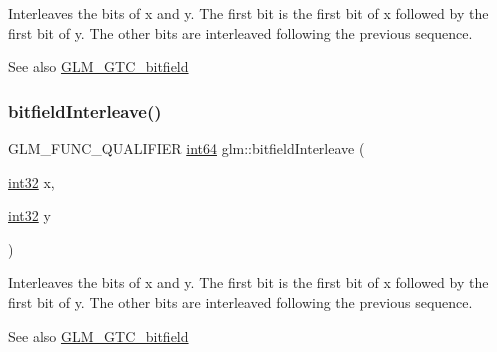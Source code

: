 Interleaves the bits of x and y. The first bit is the first bit of x followed by the first bit of y. The other bits are interleaved following the previous sequence.

\begin{DoxySeeAlso}{See also}
\hyperlink{group__gtc__bitfield}{G\+L\+M\+\_\+\+G\+T\+C\+\_\+bitfield} 
\end{DoxySeeAlso}
\mbox{\label{group__gtc__bitfield_ga0de51d5985e6a703f305a5a61479babd}} 
\subsubsection{\texorpdfstring{bitfield\+Interleave()}{bitfieldInterleave()}\hspace{0.1cm}{\footnotesize\ttfamily [5/16]}}
{\footnotesize\ttfamily G\+L\+M\+\_\+\+F\+U\+N\+C\+\_\+\+Q\+U\+A\+L\+I\+F\+I\+ER \hyperlink{group__gtc__type__precision_ga435d75819cce297cc5fa21bd84ef89a5}{int64} glm\+::bitfield\+Interleave (\begin{DoxyParamCaption}\item[{\hyperlink{group__gtc__type__precision_ga632d8b25f6b61659f39ea4321fab92a4}{int32}}]{x,  }\item[{\hyperlink{group__gtc__type__precision_ga632d8b25f6b61659f39ea4321fab92a4}{int32}}]{y }\end{DoxyParamCaption})}

Interleaves the bits of x and y. The first bit is the first bit of x followed by the first bit of y. The other bits are interleaved following the previous sequence.

\begin{DoxySeeAlso}{See also}
\hyperlink{group__gtc__bitfield}{G\+L\+M\+\_\+\+G\+T\+C\+\_\+bitfield} 
\end{DoxySeeAlso}
\mbox{\label{group__gtc__bitfield_ga2bc87fd66f6f8471c1a46888360cef12}} 
